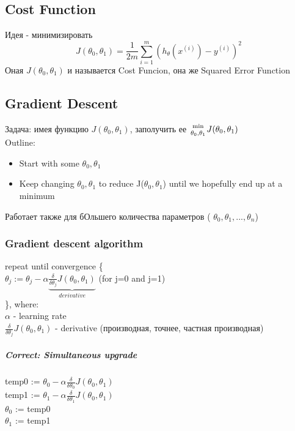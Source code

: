 \documentclass{scrartcl}
\begin{document}
\subsection {Cost Function}
\label{2-2}
Идея - минимизировать \[
J(\theta_0, \theta_1) = \frac{1}{2m} \sum_{i=1}^m\left( h_\theta (x^{(i)}) - y^{(i)} \right)^2
\]
Оная $J(\theta_0, \theta_1)$ и называется Cost Funcion, она же Squared
Error Function

\subsection {Gradient Descent}
\label {2-5}
Задача: имея функцию $J(\theta_0, \theta_1)$, заполучить ее
${\min \atop \theta_0, \theta_1} J(\theta_0, \theta_1)$ \\
 Outline:
\begin {itemize}
\item Start with some $\theta_0, \theta_1$
\item Keep changing $\theta_0, \theta_1$ to reduce J($\theta_0,
  \theta_1$) until we hopefully end up at a minimum
\end{itemize}
Работает также для бОльшего количества параметров ( $\theta_0,
\theta_1,..., \theta_n$)
\subsubsection {Gradient descent algorithm}
repeat until convergence \{ \\
$\theta_j := \theta_j - {\alpha} \underbrace{ \frac {\delta}{\delta \theta_j} J(\theta_0,
  \theta_1)}_{derivative}$ (for j=0 and j=1) \\
\}, where: \\
$\alpha$ - learning rate \\
$\frac {\delta}{\delta \theta_j} J(\theta_0, \theta_1)$ - derivative
(производная, точнее, частная производная)

\subparagraph {Correct: Simultaneous upgrade}

temp0 := $\theta_0 - \alpha \frac {\delta}{\delta \theta_0} J(\theta_0,
  \theta_1)$ \\
temp1 := $\theta_1 - \alpha \frac {\delta}{\delta \theta_1} J(\theta_0,
  \theta_1)$ \\
$\theta_0$ := temp0 \\
$\theta_1$ := temp1 \\
\end{document}
